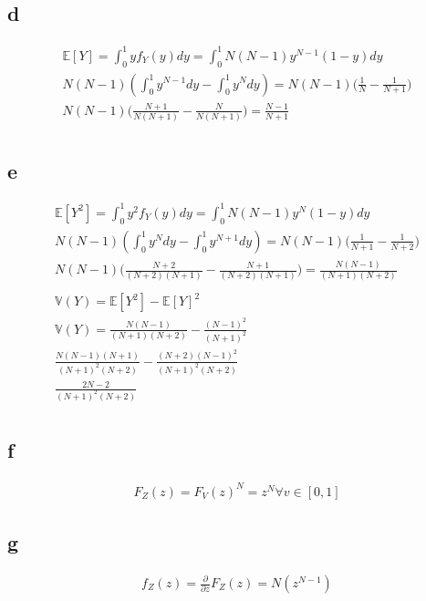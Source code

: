 \documentclass[10pt]{paper}
\begin{document}
\subsection*{d}
\begin{align*}
  \mathbb{E}[Y] = \int_0^1 y f_Y(y)dy = \int_0^1 N(N-1)y^{N-1}(1-y)dy\\
  N(N-1) ( \int_0^1 y^{N-1}dy - \int_0^1 y^N dy ) = N(N-1) \big ( \frac{1}{N} -\frac{1}{N+1} \big )\\
  N(N-1) \big ( \frac{N+1}{N(N+1)} - \frac{N}{N(N+1)} \big ) = \frac{N-1}{N+1}\\
\end{align*}

\subsection*{e}

\begin{align*}
  \mathbb{E}[Y^2] = \int_0^1 y^2 f_Y(y)dy = \int_0^1 N(N-1)y^{N}(1-y)dy\\
  N(N-1) ( \int_0^1 y^{N}dy - \int_0^1 y^{N+1} dy ) = N(N-1) \big ( \frac{1}{N+1} -\frac{1}{N+2} \big )\\
  N(N-1) \big ( \frac{N+2}{(N+2)(N+1)} - \frac{N+1}{(N+2)(N+1)} \big ) = \frac{N(N-1)}{(N+1)(N+2)}\\
  \\
  \mathbb{V}(Y) = \mathbb{E}[Y^2] -\mathbb{E}[Y]^2\\
  \mathbb{V}(Y) = \frac{N(N-1)}{(N+1)(N+2)} -\frac{(N-1)^2}{(N+1)^2}\\
  \frac{N(N-1)(N+1)}{(N+1)^2(N+2)} - \frac{(N+2)(N-1)^2}{(N+1)^2(N+2)}\\
  \frac{2N -2}{(N+1)^2(N+2)}\\
\end{align*}  

\subsection*{f}

\begin{align*}
  F_Z(z) = F_V(z)^N = z^N \forall v \in [0,1]
\end{align*}

\subsection*{g}

\begin{align*}
  f_Z(z) = \frac{\partial}{\partial z}F_Z(z) = N( z^{N-1} )
\end{align*}
\end{document}
